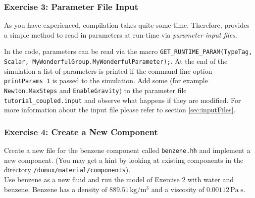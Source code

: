 \subsubsection{Exercise 3: Parameter File Input}

As you have experienced, compilation takes quite some time. Therefore,
\Dumux provides a simple method to read in parameters at run-time
via \textit{parameter input files}.

In the code, parameters can be read via the macro
\texttt{GET\_RUNTIME\_PARAM(TypeTag, Scalar,
  MyWonderfulGroup.MyWonderfulParameter);}. At the end of the
simulation a list of parameters is printed if the command line option
\texttt{-printParams 1} is passed to the simulation. Add some (for
example \texttt{Newton.MaxSteps} and \texttt{EnableGravity}) to the
parameter file \texttt{tutorial\_coupled.input} and observe what
happens if they are modified. For more information about the input file please refer to section \ref{sec:inputFiles}.

\subsubsection{Exercise 4: Create a New Component}

Create a new file for the benzene component called \texttt{benzene.hh}
and implement a new component. (You may get a hint by looking at
existing components in the directory \verb+/dumux/material/components+). \\
Use benzene as a new fluid and run the model of Exercise 2 with water
and benzene. Benzene has a density of $889.51 \, \text{kg} /
\text{m}^3$ and a viscosity of $0.00112 \, \text{Pa} \; \text{s}$.

\clearpage \newpage

